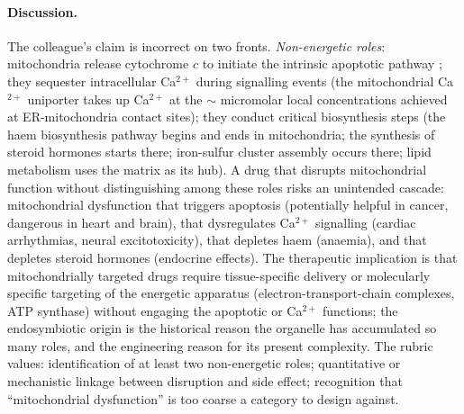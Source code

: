 \paragraph{Discussion.}
The colleague's claim is incorrect on two fronts. \emph{Non-energetic
roles}: mitochondria release cytochrome $c$ to initiate the intrinsic
apoptotic pathway \cite{paper:v6c01-vaux-korsmeyer-1999}; they
sequester intracellular Ca$^{2+}$ during signalling events (the
mitochondrial Ca$^{2+}$ uniporter takes up Ca$^{2+}$ at the
$\sim$ micromolar local concentrations achieved at ER-mitochondria
contact sites); they conduct critical biosynthesis steps (the haem
biosynthesis pathway begins and ends in mitochondria; the synthesis
of steroid hormones starts there; iron-sulfur cluster assembly
occurs there; lipid metabolism uses the matrix as its hub). A drug
that disrupts mitochondrial function without distinguishing among
these roles risks an unintended cascade: mitochondrial dysfunction
that triggers apoptosis (potentially helpful in cancer, dangerous in
heart and brain), that dysregulates Ca$^{2+}$ signalling (cardiac
arrhythmias, neural excitotoxicity), that depletes haem (anaemia),
and that depletes steroid hormones (endocrine effects). The
therapeutic implication is that mitochondrially targeted drugs
require tissue-specific delivery or molecularly specific targeting
of the energetic apparatus (electron-transport-chain complexes, ATP
synthase) without engaging the apoptotic or Ca$^{2+}$ functions; the
endosymbiotic origin \cite{paper:v6c01-margulis-1967} is the
historical reason the organelle has accumulated so many roles, and
the engineering reason for its present complexity. The rubric values:
identification of at least two non-energetic roles; quantitative or
mechanistic linkage between disruption and side effect; recognition
that ``mitochondrial dysfunction'' is too coarse a category to design
against.
